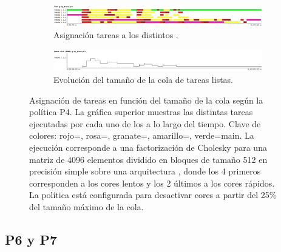 \begin{figure}
  \centering
  \begin{framed}
    \begin{subfigure}{.9\textwidth}
      \centering
      \includegraphics[width=1\linewidth]{Figures/Politicas_evo/Apagado_tareas.png}
      \caption{Asignación tareas a los distintos \wts.}
      \label{}
    \end{subfigure}

    \begin{subfigure}{0.9\textwidth}
      \centering
      \includegraphics[width=1\linewidth]{Figures/Politicas_evo/Apagado_colas.png}
      \caption{Evolución del tamaño de la cola de tareas listas.}
      \label{}
    \end{subfigure}  
    
  \end{framed}
  \caption[Asignación de tareas en función del tamaño de la cola según la
  política P4]{Asignación de tareas en función del tamaño de la cola según
    la política P4. La gráfica superior muestras las distintas tareas
    ejecutadas por cada uno de los \wts a lo largo del tiempo. Clave de
    colores: rojo=\trsm, rosa=\potrf, granate=\syrk, amarillo=\gemm,
    verde={\sc main}. La ejecución corresponde a una factorización de
    Cholesky para una matriz de 4096 elementos dividido en bloques de
    tamaño 512 en precisión simple sobre una arquitectura \juno, donde los
    4 primeros \wts corresponden a los cores lentos y los 2 últimos a los
    cores rápidos. La política está configurada para desactivar cores a
    partir del 25\% del tamaño máximo de la cola.}
  \label{fig:P4-evo}
\end{figure}



\subsection{P6 y P7}

